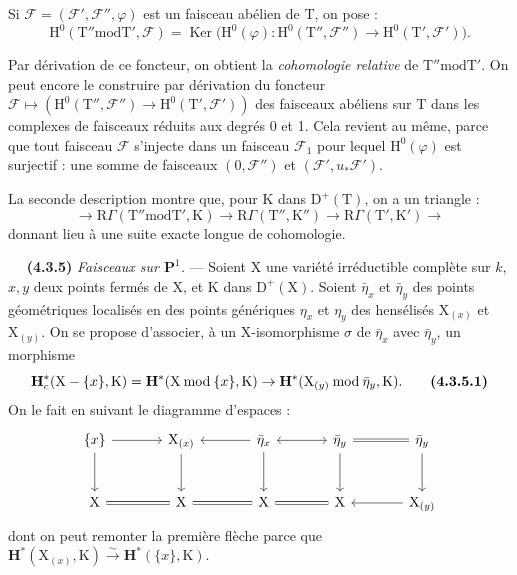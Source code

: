 \documentclass[11pt,leqno]{article}
\newcommand{\Page}[1]{\ifvmode\noindent\else\unskip\ \fi{\footnotesize\textcolor{gray}{[p.\,#1]}}\ \ignorespaces}
\begin{document}
Si \(\mathscr{F}=(\mathscr{F}',\mathscr{F}'',\varphi)\) est un faisceau abélien de \(\mathrm{T}\), on pose :
\[
\mathrm{H}^0(\mathrm{T}''\mathbin{\mathrm{mod}}\mathrm{T}',\mathscr{F})
=
\operatorname{Ker}
\bigl(\mathrm{H}^0(\varphi):
\mathrm{H}^0(\mathrm{T}'',\mathscr{F}'')
\to\mathrm{H}^0(\mathrm{T}',\mathscr{F}')\bigr).
\]

Par dérivation de ce foncteur, on obtient la \textit{cohomologie relative} de \(\mathrm{T}''\mathbin{\mathrm{mod}}\mathrm{T}'\). On peut encore le construire par dérivation du foncteur \(\mathscr{F}\mapsto(\mathrm{H}^0(\mathrm{T}'',\mathscr{F}'')\to\mathrm{H}^0(\mathrm{T}',\mathscr{F}'))\) des faisceaux abéliens sur \(\mathrm{T}\) dans les complexes de faisceaux réduits aux degrés 0 et 1. Cela revient au même, parce que tout faisceau \(\mathscr{F}\) s’injecte dans un faisceau \(\mathscr{F}_1\) pour lequel \(\mathrm{H}^0(\varphi)\) est surjectif : une somme de faisceaux \((0,\mathscr{F}'')\) et \((\mathscr{F}',u_*\mathscr{F}')\).

La seconde description montre que, pour \(\mathrm{K}\) dans \(\mathrm{D}^+(\mathrm{T})\), on a un triangle :
\[
\to\mathrm{R}\Gamma(\mathrm{T}''\mathbin{\mathrm{mod}}\mathrm{T}',\mathrm{K})
\to\mathrm{R}\Gamma(\mathrm{T}'',\mathrm{K}'')
\to\mathrm{R}\Gamma(\mathrm{T}',\mathrm{K}')
\to
\]
donnant lieu à une suite exacte longue de cohomologie.

\Page{224}
\textbf{(4.3.5)} \textit{Faisceaux sur \(\mathbf{P}^1\).} — Soient \(\mathrm{X}\) une variété irréductible complète sur \(k\), \(x,y\) deux points fermés de \(\mathrm{X}\), et \(\mathrm{K}\) dans \(\mathrm{D}^+(\mathrm{X})\). Soient \(\bar\eta_x\) et \(\bar\eta_y\) des points géométriques localisés en des points génériques \(\eta_x\) et \(\eta_y\) des hensélisés \(\mathrm{X}_{(x)}\) et \(\mathrm{X}_{(y)}\). On se propose d’associer, à un \(\mathrm{X}\)-isomorphisme \(\sigma\) de \(\bar\eta_x\) avec \(\bar\eta_y\), un morphisme
\[
\mathbf{H}_c^*(\mathrm{X}-\{x\},\mathrm{K})
=
\mathbf{H}^*(\mathrm{X}\mathbin{\mathrm{mod}}\{x\},\mathrm{K})
\to
\mathbf{H}^*(\mathrm{X}_{(y)}\mathbin{\mathrm{mod}}\bar\eta_y,\mathrm{K}).
\tag*{\textbf{(4.3.5.1)}}
\]
On le fait en suivant le diagramme d’espaces :
\[
\begin{tikzcd}[column sep=large,row sep=large]
\{x\} \arrow[r] \arrow[d]
  & \mathrm{X}_{(x)} \arrow[d]
  & \bar\eta_x \arrow[l] \arrow[r,leftrightarrow] \arrow[d]
  & \bar\eta_y \arrow[r,equal] \arrow[d]
  & \bar\eta_y \arrow[d] \\
\mathrm{X} \arrow[r,equal]
  & \mathrm{X} \arrow[r,equal]
  & \mathrm{X} \arrow[r,equal]
  & \mathrm{X} \arrow[r,leftarrow]
  & \mathrm{X}_{(y)}
\end{tikzcd}
\]
dont on peut remonter la première flèche parce que \(\mathbf{H}^*(\mathrm{X}_{(x)},\mathrm{K})\xrightarrow{\sim}\mathbf{H}^*(\{x\},\mathrm{K})\).
\end{document}
